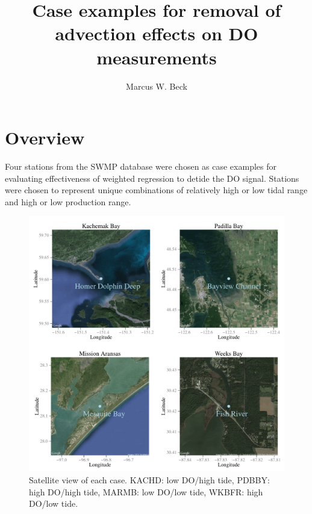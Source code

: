 \documentclass{article}\usepackage{graphicx, color}
\makeatletter
\def\maxwidth{ %
  \ifdim\Gin@nat@width>\linewidth
    \linewidth
  \else
    \Gin@nat@width
  \fi
}
\newenvironment{knitrout}{}{} %
\makeatother
\begin{document}
\setlength{\parskip}{5mm}
\setlength{\parindent}{0in}

\title{Case examples for removal of advection effects on DO measurements}
\author{Marcus W. Beck}
\maketitle

\section{Overview}

Four stations from the SWMP database were chosen as case examples for evaluating effectiveness of weighted regression to detide the DO signal.  Stations were chosen to represent unique combinations of relatively high or low tidal range and high or low production range.

\clearpage


\begin{knitrout}
\color{fgcolor}\begin{figure}[]


{\centering \includegraphics[width=\maxwidth]{figure/case_map} 

}

\caption[Satellite view of each case]{Satellite view of each case. KACHD: low DO/high tide, PDBBY: high DO/high tide, MARMB: low DO/low tide, WKBFR: high DO/low tide.\label{fig:case_map}}
\end{figure}


\end{knitrout}
\end{document}
